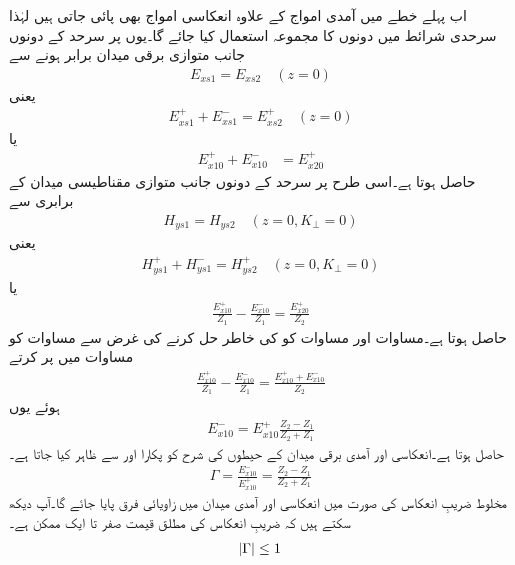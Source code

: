 اب پہلے خطے میں آمدی امواج کے علاوہ انعکاسی امواج بھی پائی جاتی ہیں لہٰذا سرحدی شرائط میں دونوں کا مجموعہ استعمال کیا جائے گا۔یوں  پر سرحد کے دونوں جانب متوازی برقی میدان برابر  ہونے سے
\begin{align*}
E_{xs1}=E_{xs2}    \quad (z=0)
\end{align*}
یعنی
\begin{align*}
E_{xs1}^+ +E_{xs1}^-=E_{xs2}^+ \quad (z=0)
\end{align*}
یا
\begin{align}\label{مساوات_موج_برقی_شرط_پورا}
E_{x10}^+ + E_{x10}^-&=E_{x20}^+
\end{align}
حاصل ہوتا ہے۔اسی طرح   پر سرحد کے دونوں جانب متوازی مقناطیسی میدان کے برابری سے
\begin{align*}
H_{ys1}=H_{ys2} \quad (z=0, K_\perp=0)
\end{align*}
یعنی
\begin{align*}
H_{ys1}^+ +H_{ys1}^-=H_{ys2}^+ \quad (z=0, K_\perp=0)
\end{align*}
یا
\begin{align}\label{مساوات_موج_مقناطیسی_شرط_پورا}
\frac{E_{x10}^+}{Z_1}-\frac{E_{x10}^-}{Z_1}=\frac{E_{x20}^+}{Z_2}
\end{align}
حاصل ہوتا ہے۔مساوات  اور مساوات  کو  کی خاطر حل کرنے کی غرض سے مساوات  کو مساوات  میں پر کرتے
\begin{align*}
\frac{E_{x10}^+}{Z_1}-\frac{E_{x10}^-}{Z_1}=\frac{E_{x10}^+ + E_{x10}^-}{Z_2}
\end{align*}
ہوئے یوں
\begin{align*}
E_{x10}^- =E_{x10}^+ \frac{Z_2-Z_1}{Z_2+Z_1}
\end{align*}
حاصل ہوتا ہے۔انعکاسی اور آمدی برقی میدان کے حیطوں کی شرح کو  پکارا  اور  سے ظاہر کیا جاتا ہے۔
\begin{align}\label{مساوات_موج_شرح_انعکاس_تعریف}
\Gamma=\frac{E_{x10}^-}{E_{x10}^+}=\frac{Z_2-Z_1}{Z_2+Z_1}
\end{align}
مخلوط ضریبِ انعکاس کی صورت میں انعکاسی اور آمدی میدان میں زاویائی فرق پایا جائے گا۔آپ دیکھ سکتے ہیں کہ ضریبِ انعکاس کی مطلق قیمت صفر تا ایک ممکن ہے۔
\begin{align}
\abs{\Gamma} \le 1
\end{align}


